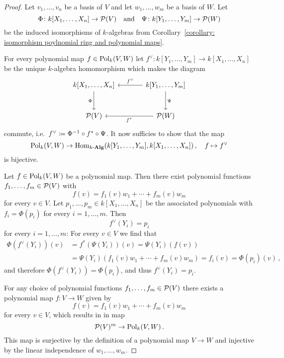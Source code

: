 \begin{proof}
  Let $v_1, \dotsc, v_n$ be a basis of $V$ and let $w_1, \dotsc, w_m$ be a basis of $W$.  
  Let
  \[
            \Phi
    \colon  k[X_1, \dotsc, X_n]
    \to     \mathcal{P}(V)
    \quad\text{and}\quad
            \Psi
    \colon  k[Y_1, \dotsc, Y_m]
    \to     \mathcal{P}(W)
  \]
  be the induced isomorphisms of $k$-algebras from Corollary~\ref{corollary: isomorphism poylnomial ring and polynomial maps}.
  
  For every polynomial map $f \in \operatorname{Pol}_k(V,W)$ let $f^\vee \colon k[Y_1, \dotsc, Y_m] \to k[X_1, \dotsc, X_n]$ be the unique $k$-algebra homomorphism which makes the diagram
  \[
    \begin{tikzcd}[sep = large]
        k[X_1, \dotsc, X_n]
        \arrow{d}[left]{\Phi}
      & k[Y_1, \dotsc, Y_m]
        \arrow{l}[above]{f^\vee}
        \arrow{d}[right]{\Psi}
      \\
        \mc{P}(V)
      & \mc{P}(W)
        \arrow{l}[below]{f^*}
    \end{tikzcd}
  \]
  commute, i.e.\ $f^\vee \coloneqq \Phi^{-1} \circ f^* \circ \Psi$.
  It now sufficies to show that the map
  \[
            \operatorname{Pol}_k(V,W)
    \to     \operatorname{Hom}_{k\text{-}\mathbf{Alg}}(k[Y_1, \dotsc, Y_m], k[X_1, \dotsc, X_n]) \,,
    \quad   f
    \mapsto f^\vee
  \]
  is bijective.
  
  Let $f \in \operatorname{Pol}_k(V,W)$ be a polynomial map.
  Then there exist polynomial functions $f_1, \dotsc, f_m \in \mathcal{P}(V)$ with
  \[
      f(v)
    = f_1(v) w_1 + \dotsb + f_m(v) w_m
  \]
  for every $v \in V$.
  Let $p_1, \dotsc, p_m \in k[X_1, \dotsc, X_n]$ be the associated polynomials with $f_i = \Phi(p_i)$ for every $i = 1, \dotsc, m$.
  Then
  \begin{equation}
    \label{equation: Yi to pi}
      f^\vee(Y_i)
    = p_i
  \end{equation}
  for every $i = 1, \dotsc, m$:
  For every $v \in V$ we find that
  \begin{align*}
        \Phi( f^\vee(Y_i) )(v)
    &=  f^*( \Psi(Y_i) )(v)
     =  \Psi(Y_i)( f(v) ) \\
    &=  \Psi(Y_i)( f_1(v) w_1 + \dotsb + f_m(v) w_m )
     =  f_i(v)
     =  \Phi(p_i)(v) \,,
  \end{align*}
  and therefore $\Phi( f^\vee(Y_i) ) = \Phi(p_i)$, and thus $f^\vee(Y_i) = p_i$.
  
  For any choice of polynomial functions $f_1, \dotsc, f_m \in \mathcal{P}(V)$ there exists a polynomial map $f \colon V \to W$ given by
  \[
      f(v)
    = f_1(v) w_1 + \dotsb + f_m(v) w_m
  \]
  for every $v \in V$, which results in in map
  \[
        \mathcal{P}(V)^m
    \to \operatorname{Pol}_k(V,W) \,.
  \]
  This map is surjective by the definition of a polynomial map $V \to W$ and injective by the linear independence of $w_1, \dotsc, w_m$.
  

\end{proof}
